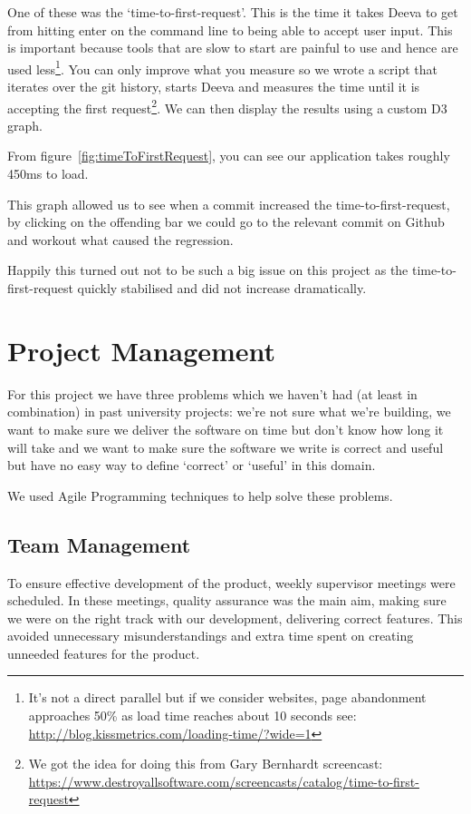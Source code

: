 \documentclass[11pt, a4paper]{article}
\begin{document}
One of these was the `time-to-first-request'.
This is the time it takes Deeva to get from hitting enter on the command line to being able to accept user input.
This is important because tools that are slow to start are painful to use and hence are used less\footnote{It's not a direct parallel but if we consider websites, page abandonment approaches 50\% as load time reaches about 10 seconds see: \url{http://blog.kissmetrics.com/loading-time/?wide=1}}.
You can only improve what you measure so we wrote a script that iterates over the git history, starts Deeva and measures the time until it is accepting the first request\footnote{We got the idea for doing this from Gary Bernhardt screencast: \url{https://www.destroyallsoftware.com/screencasts/catalog/time-to-first-request}}.
We can then display the results using a custom D3 graph.

From figure~\ref{fig:timeToFirstRequest}, you can see our application takes roughly 450ms to load.

This graph allowed us to see when a commit increased the time-to-first-request, by clicking on the offending bar we could go to the relevant commit on Github and workout what caused the regression.

Happily this turned out not to be such a big issue on this project as the time-to-first-request quickly stabilised and did not increase dramatically. 

\section{Project Management}
For this project we have three problems which we haven't had (at least in combination) in past university projects: we're not sure what we're building, we want to make sure we deliver the software on time but don't know how long it will take and
we want to make sure the software we write is correct and useful but have no easy way to define `correct' or `useful' in this domain.

We used Agile Programming techniques to help solve these problems.

\subsection{Team Management}

To ensure effective development of the product, weekly supervisor meetings were scheduled.
In these meetings, quality assurance was the main aim, making sure we were on the right track with our development, delivering correct features. 
This avoided unnecessary misunderstandings and extra time spent on creating unneeded features for the product. 
\end{document}
